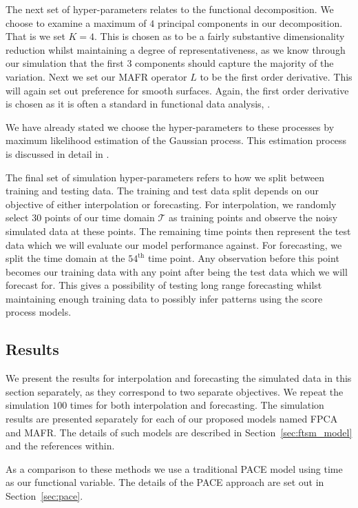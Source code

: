 The next set of hyper-parameters relates to the functional decomposition.
We choose to examine a maximum of $4$ principal components in our decomposition.
That is we set $K = 4$. 
This is chosen as to be a fairly substantive dimensionality reduction whilst maintaining a degree of representativeness, as we know through our simulation that the first $3$ components should capture the majority of the variation.
Next we set our MAFR operator $L$ to be the first order derivative.
This will again set out preference for smooth surfaces. 
Again, the first order derivative is chosen as it is often a standard in functional data analysis, \citep{ramsay_functional_2010}. 

We have already stated we choose the hyper-parameters to these processes by maximum likelihood estimation of the Gaussian process.
This estimation process is discussed in detail in \citep{williams_gaussian_2006}.

The final set of simulation hyper-parameters refers to how we split between training and testing data.
The training and test data split depends on our objective of either interpolation or forecasting.
For interpolation, we randomly select $30$ points of our time domain $\mathcal{T}$ as training points and observe the noisy simulated data at these points.
The remaining time points then represent the test data which we will evaluate our model performance against.
For forecasting, we split the time domain at the $54^\text{th}$ time point.
Any observation before this point becomes our training data with any point after being the test data which we will forecast for. 
This gives a possibility of testing long range forecasting whilst maintaining enough training data to possibly infer patterns using the score process models.

\subsection{Results \label{ssec:ftsm_sim_res}}
We present the results for interpolation and forecasting the simulated data in this section separately, as they correspond to two separate objectives.
We repeat the simulation $100$ times for both interpolation and forecasting.
The simulation results are presented separately for each of our proposed models named FPCA and MAFR.
The details of such models are described in Section~\ref{sec:ftsm_model} and the references within.

As a comparison to these methods we use a traditional PACE model using time as our functional variable.
The details of the PACE approach are set out in Section~\ref{sec:pace}.

